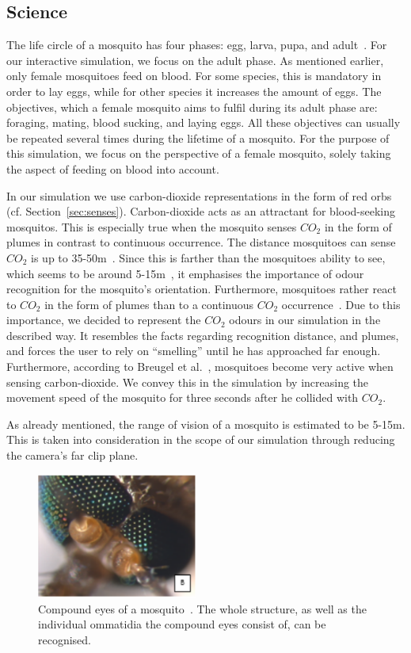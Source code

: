 \documentclass{sig-alternate-05-2015}
\begin{document}
\subsection{Science}
\label{sec:proj_science}
The life circle of a mosquito has four phases: egg, larva, pupa, and adult~\cite{howstuff}. For our interactive simulation, we focus on the adult phase. As mentioned earlier, only female mosquitoes
feed on blood. For some species, this is mandatory in order to lay eggs, while for other species it increases the amount of eggs. The objectives, which a female mosquito aims to fulfil during its adult phase are: foraging, mating, blood sucking, and laying eggs. All these objectives can usually be repeated several times during the lifetime of a mosquito. For the purpose of this simulation, we focus on the perspective of a female mosquito, solely taking the aspect of feeding on blood into account.  

In our simulation we use carbon-dioxide representations in the form of red orbs (cf. Section~\ref{sec:senses}). Carbon-dioxide acts as an attractant for blood-seeking mosquitos. This is especially true when the mosquito senses $CO_2$ in the form of plumes in contrast to continuous occurrence. The distance mosquitoes can sense $CO_2$ is up to 35-50m~\cite{guerenstein2008, breugel2015}. Since this is farther than the mosquitoes ability to see, which seems to be around 5-15m~\cite{breugel2015}, it emphasises the importance of odour recognition for the mosquito's orientation. Furthermore, mosquitoes rather react to $CO_2$ in the form of plumes than to a continuous $CO_2$ occurrence~\cite{guerenstein2008}. Due to this importance, we decided to represent the $CO_2$ odours in our simulation in the described way. It resembles the facts regarding recognition distance, and plumes, and forces the user to rely on ``smelling'' until he has approached far enough. 
Furthermore, according to Breugel et al.~\cite{breugel2015}, mosquitoes become very active when sensing carbon-dioxide. We convey this in the simulation by increasing the movement speed of the mosquito for three seconds after he collided with $CO_2$.

As already mentioned, the range of vision of a mosquito is estimated to be 5-15m. This is taken into consideration in the scope of our simulation through reducing the camera's far clip plane.

\begin{figure}[h!]
\includegraphics[width=0.47\textwidth]{Figures/compoundeye_real.png}
\caption{Compound eyes of a mosquito~\cite{singh2013}. The whole structure, as well as the individual ommatidia the compound eyes consist of, can be recognised. }
\label{fig:compoundeye_real}
\end{figure}
\end{document}
